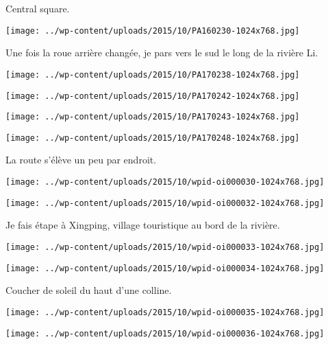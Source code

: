   Central square. 
\begin{center} \texttt{[image: ../wp-content/uploads/2015/10/PA160230-1024x768.jpg]} \end{center}

 Une fois la roue arrière changée, je pars vers le sud le long de la rivière Li. 
\begin{center} \texttt{[image: ../wp-content/uploads/2015/10/PA170238-1024x768.jpg]} \end{center}
\begin{center} \texttt{[image: ../wp-content/uploads/2015/10/PA170242-1024x768.jpg]} \end{center}
\begin{center} \texttt{[image: ../wp-content/uploads/2015/10/PA170243-1024x768.jpg]} \end{center}
\begin{center} \texttt{[image: ../wp-content/uploads/2015/10/PA170248-1024x768.jpg]} \end{center}

  La route s'élève un peu par endroit.
\begin{center} \texttt{[image: ../wp-content/uploads/2015/10/wpid-oi000030-1024x768.jpg]} \end{center}
\begin{center} \texttt{[image: ../wp-content/uploads/2015/10/wpid-oi000032-1024x768.jpg]} \end{center}

 Je fais étape à Xingping, village touristique au bord de la rivière. 
\begin{center} \texttt{[image: ../wp-content/uploads/2015/10/wpid-oi000033-1024x768.jpg]} \end{center}
\begin{center} \texttt{[image: ../wp-content/uploads/2015/10/wpid-oi000034-1024x768.jpg]} \end{center}

 Coucher de soleil du haut d'une colline. 
\begin{center} \texttt{[image: ../wp-content/uploads/2015/10/wpid-oi000035-1024x768.jpg]} \end{center}
\begin{center} \texttt{[image: ../wp-content/uploads/2015/10/wpid-oi000036-1024x768.jpg]} \end{center}

